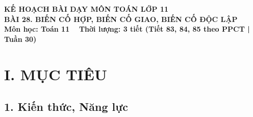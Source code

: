 \documentclass[12pt, a4paper]{article}
\begin{document}
\begin{center}
    {\fontsize{14pt}{17pt}\selectfont \textbf{KẾ HOẠCH BÀI DẠY MÔN TOÁN LỚP 11}}\\[6pt]
    {\fontsize{16pt}{19pt}\selectfont \textbf{BÀI 28. BIẾN CỐ HỢP, BIẾN CỐ GIAO, BIẾN CỐ ĐỘC LẬP}}\\[4pt]
    {\fontsize{12pt}{15pt}\selectfont \textbf{Môn học: Toán 11} \ \textbar \ \textbf{Thời lượng: 3 tiết (Tiết 83, 84, 85 theo PPCT | Tuần 30)}}
\end{center}

\vspace{5pt}

\section*{I. MỤC TIÊU}

\subsection*{1. Kiến thức, Năng lực}
\end{document}
